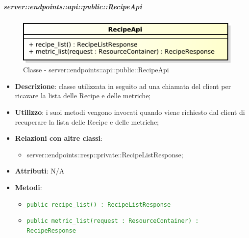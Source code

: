     \subparagraph{server::endpoints::api::public::RecipeApi} %
    \label{subp:bdsm_app_server_endpoints_api_public_recipeapi}
	\begin{figure}[!htbp]
		\centering
		\centerline{\includegraphics[scale=0.6]{./images/server/classes/endpoints/recipe_api.pdf}}
		\caption{Classe - server::endpoints::api::public::RecipeApi}
	\end{figure}
    \begin{itemize}
      \item \textbf{Descrizione}: classe utilizzata in seguito ad una chiamata del client per ricavare la lista delle Recipe e delle metriche;
      \item \textbf{Utilizzo}: i suoi metodi vengono invocati quando viene richiesto dal client di recuperare la lista delle Recipe e delle metriche;
      \item \textbf{Relazioni con altre classi}:
        \begin{itemize}
          \item server::endpoints::resp::private::RecipeListResponse;
        \end{itemize}
		  \item \textbf{Attributi}: N/A
		  \item \textbf{Metodi}:
			\begin{itemize}
				\item \textcolor{forestgreen}{\texttt{public recipe\_list() : RecipeListResponse}}
				\item \textcolor{forestgreen}{\texttt{public metric\_list(request : ResourceContainer) :
        RecipeResponse}}
			\end{itemize}
      \end{itemize}

